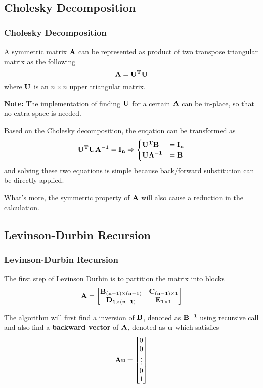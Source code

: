 \documentclass{beamer}
\begin{document}
\begin{frame}
	\subsection{Cholesky Decomposition}
	\frametitle{Cholesky Decomposition}
	A symmetric matrix ${\bf A}$ can be represented as product of two transpose triangular matrix as the following $${\bf A = U^TU}$$ where ${\bf U}$ is an $n\times n$ upper triangular matrix.

	{\bf Note: }The implementation of finding ${\bf U}$ for a certain ${\bf A}$ can be in-place, so that no extra space is needed.
	
\end{frame}

\begin{frame}
	Based on the Cholesky decomposition, the euqation can be transformed as $${\bf U^TUA^{-1}=I_n \Rightarrow \begin{cases}\bf U^TB &= \bf I_n\\\bf UA^{-1}&=\bf B\end{cases}}$$ and solving these two equations is simple because back/forward substitution can be directly applied. 
		
	What's more, the symmetric property of ${\bf A}$ will also cause a reduction in the calculation.
\end{frame}

\begin{frame}
	\subsection{Levinson-Durbin Recursion}
	\frametitle{Levinson-Durbin Recursion}
The first step of Levinson Durbin is to partition the matrix into blocks $$ {\bf A = \left[\begin{matrix}\bf B_{(n-1)\times(n-1)} & \bf C_{(n-1)\times 1} \\\bf D_{1\times (n-1)} & \bf E_{1\times 1}\end{matrix}\right]}$$

The algorithm will first find a inversion of ${\bf B}$, denoted as ${\bf B^{-1}}$ using recursive call and also find a {\bf backward vector} of ${\bf A}$, denoted as ${\bf u}$ which satisfies $${\bf Au} = \left[\begin{matrix} 0\\0\\ \vdots \\0\\1 \end{matrix}\right]$$
\end{frame}
\end{document}

